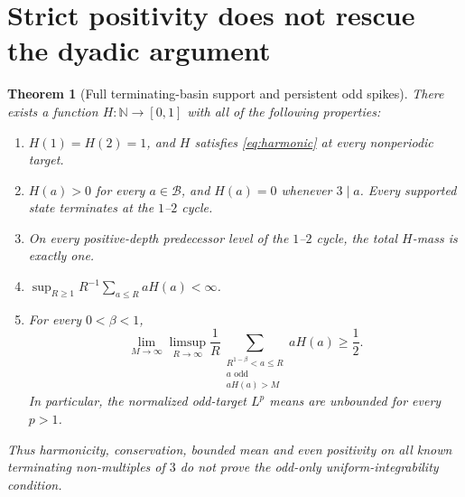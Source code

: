 \documentclass[11pt,a4paper]{article}
\newtheorem{theorem}{Theorem}
\newcommand{\N}{\mathbb N}
\begin{document}
\section{Strict positivity does not rescue the dyadic argument}
\begin{theorem}[Full terminating-basin support and persistent odd spikes]
\label{thm:positive}
There exists a function $H:\N\to[0,1]$ with all of the following
properties:
\begin{enumerate}
\item $H(1)=H(2)=1$, and $H$ satisfies \eqref{eq:harmonic} at every
nonperiodic target.
\item $H(a)>0$ for every $a\in\mathcal B$, and $H(a)=0$ whenever
$3\mid a$. Every supported state terminates at the $1$--$2$ cycle.
\item On every positive-depth predecessor level of the $1$--$2$
cycle, the total $H$-mass is exactly one.
\item $\sup_{R\ge1}R^{-1}\sum_{a\le R}aH(a)<\infty$.
\item For every $0<\beta<1$,
\begin{equation}\label{eq:failure}
 \lim_{M\to\infty}\limsup_{R\to\infty}
 \frac1R\sum_{\substack{R^{1-\beta}<a\le R\\a\text{ odd}\\aH(a)>M}}
 aH(a)\ge\frac12.
\end{equation}
In particular, the normalized odd-target $L^p$ means are unbounded
for every $p>1$.
\end{enumerate}
Thus harmonicity, conservation, bounded mean and even positivity on
all \emph{known terminating} non-multiples of $3$ do not prove the
odd-only uniform-integrability condition.
\end{theorem}
\end{document}
